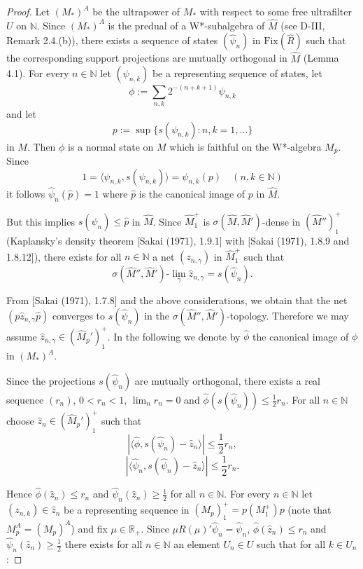 \begin{proof}
Let \((M_{*})^{A}\) be the ultrapower of \(M_{*}\) with respect to some free ultrafilter \(U\) on \(\mathbb{N}\).
Since \((M_{*})^{A}\) is the predual of a W*-subalgebra of \(\hat{M}\) (see D-III, Remark 2.4.(b)), there exists a sequence of states \((\hat{\psi}_{n})\) in \(\text{Fix}(\hat{R})\) such that the corresponding support projections are mutually orthogonal in \(\hat{M}\) (Lemma 4.1).
For every \(n \in \mathbb{N}\) let \((\psi_{n,k})\) be a representing sequence of states, let
\[
\phi := \sum_{n,k} 2^{-(n+k+1)} \psi_{n,k}
\]
and let
\[
p := \sup\{s(\psi_{n,k}): n,k=1,\ldots\}
\]
in \(M\).
Then \(\phi\) is a normal state on \(M\) which is faithful on the W*-algebra \(M_{p}\).
Since 
\[
1 = \langle\psi_{n,k},s(\psi_{n,k})\rangle = \psi_{n,k}(p) \quad (n,k \in \mathbb{N})
\]
it follows \(\hat{\psi}_{n}(\hat{p}) = 1\) where \(\hat{p}\) is the canonical image of \(p\) in \(\hat{M}\).

\newpage

But this implies \(s(\hat{\psi}_{n}) \leq \hat{p}\) in \(\hat{M}\).
Since \(\hat{M}_{1}^{+}\) is \(\sigma(\hat{M},\hat{M}')\)-dense in \((\hat{M}'')_{1}^{+}\) (Kaplansky's density theorem [Sakai (1971), 1.9.1] with [Sakai (1971), 1.8.9 and 1.8.12]), there exists for all \(n \in \mathbb{N}\) a net \((z_{n,\gamma})\) in \(\hat{M}_{1}^{+}\) such that
\[
\sigma(\hat{M}'',\hat{M}')\text{-}\lim_{\gamma} \hat{z}_{n,\gamma} = s(\hat{\psi}_{n}).
\]

From [Sakai (1971), 1.7.8] and the above considerations, we obtain that the net \((p\hat{z}_{n,\gamma}\hat{p})\) converges to \(s(\hat{\psi}_{n})\) in the \(\sigma(\hat{M}'',\hat{M}')\)-topology.
Therefore we may assume \(\hat{z}_{n,\gamma} \in (\hat{M}_{p}')_{1}^{+}\).
In the following we denote by \(\hat{\phi}\) the canonical image of \(\phi\) in \((M_{*})^{A}\).

Since the projections \(s(\hat{\psi}_{n})\) are mutually orthogonal, there exists a real sequence \((r_{n})\), \(0 < r_{n} < 1\), \(\lim_{n} r_{n} = 0\) and \(\hat{\phi}(s(\hat{\psi}_{n})) \leq \frac{1}{2}r_{n}\).
For all \(n \in \mathbb{N}\) choose \(\hat{z}_{n} \in (\hat{M}_{p}')_{1}^{+}\) such that
\[
|\langle\hat{\phi},s(\hat{\psi}_{n}) - \hat{z}_{n}\rangle| \leq \frac{1}{2}r_{n},
\]
\[
|\langle\hat{\psi}_{n},s(\hat{\psi}_{n}) - \hat{z}_{n}\rangle| \leq \frac{1}{2}r_{n}.
\]

Hence \(\hat{\phi}(\hat{z}_{n}) \leq r_{n}\) and \(\hat{\psi}_{n}(\hat{z}_{n}) \geq \frac{1}{2}\) for all \(n \in \mathbb{N}\).
For every \(n \in \mathbb{N}\) let \((z_{n,k}) \in \hat{z}_{n}\) be a representing sequence in \((M_{p})_{1}^{+} = p(M_{1}^{+})p\) (note that \(M_{p}^{A} = (M_{p})^{A}\)) and fix \(\mu \in \mathbb{R}_{+}\).
Since \(\mu R(\mu)'\hat{\psi}_{n} = \hat{\psi}_{n}\), \(\hat{\phi}(\hat{z}_{n}) \leq r_{n}\) and \(\hat{\psi}_{n}(\hat{z}_{n}) \geq \frac{1}{2}\) there exists for all \(n \in \mathbb{N}\) an element \(U_{n} \in U\) such that for all \(k \in U_{n}\):


\end{proof}
